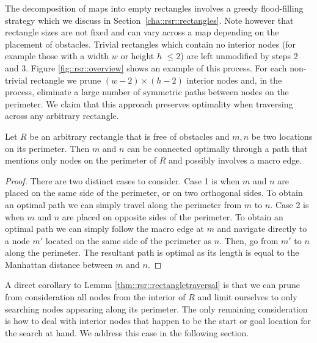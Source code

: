 The decomposition of maps into empty rectangles involves a greedy flood-filling
strategy which we discuss in Section~\ref{cha::rsr::rectangles}. Note however
that rectangle sizes are not fixed and can vary across a map depending on the
placement of obstacles.  Trivial rectangles which contain no interior nodes (for
example those with a width $w$ or height $h$ $\leq 2$) are left unmodified by
steps 2 and 3.  Figure \ref{fig::rsr::overview} shows an example of this process.  For
each non-trivial rectangle we prune $(w-2)\times(h-2)$ interior nodes and, in
the process, eliminate a large number of symmetric paths between nodes on the
perimeter.  We claim that this approach preserves optimality when traversing
across any arbitrary rectangle.

\begin{lemma}
\label{thm::rsr::rectangletraversal}
Let $R$ be an arbitrary rectangle that is free of obstacles
and $m, n$ be two locations on its perimeter.
Then $m$ and $n$ can be connected optimally through a path that
mentions only nodes on the perimeter of $R$ and possibly involves
a macro edge.
\end{lemma}
\begin{proof}
\par
There are two distinct cases to consider.
Case 1 is when $m$ and $n$ are placed on the same side of the perimeter, or
on two orthogonal sides. 
To obtain an optimal path we can simply travel along the perimeter from $m$ to $n$.
Case 2 is when $m$ and $n$ are placed on opposite sides of the perimeter.
To obtain an optimal path we can simply follow the macro edge at $m$ 
and navigate directly to a node $m'$ located on
the same side of the perimeter as $n$. Then, go from $m'$ to $n$ along the perimeter.
The resultant path is optimal as its length is equal to the Manhattan distance between $m$ and $n$.
\end{proof}

A direct corollary to Lemma \ref{thm::rsr::rectangletraversal} is that we can prune from consideration
all nodes from the interior of $R$ and limit ourselves to only searching nodes appearing along its perimeter. 
The only remaining consideration is how to deal with interior nodes that happen
to be the start or goal location for the search at hand.
We address this case in the following section.

